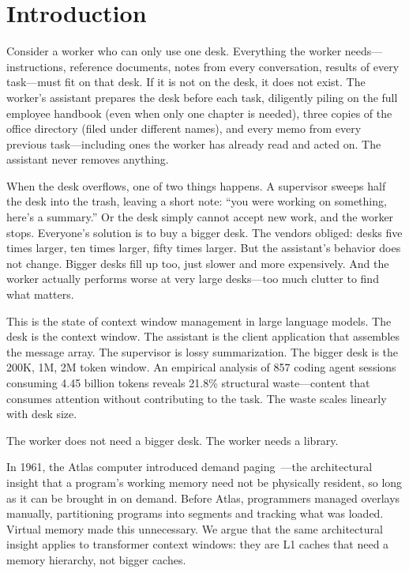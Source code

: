 \documentclass[sigplan,screen,anonymous]{acmart}
\begin{document}

\section{Introduction}

Consider a worker who can only use one desk. Everything the worker
needs---instructions, reference documents, notes from every
conversation, results of every task---must fit on that desk. If it is
not on the desk, it does not exist. The worker's assistant prepares
the desk before each task, diligently piling on the full employee
handbook (even when only one chapter is needed), three copies of the
office directory (filed under different names), and every memo from
every previous task---including ones the worker has already read and
acted on. The assistant never removes anything.

When the desk overflows, one of two things happens. A supervisor
sweeps half the desk into the trash, leaving a short note: ``you were
working on something, here's a summary.'' Or the desk simply cannot
accept new work, and the worker stops. Everyone's solution is to buy a
bigger desk. The vendors obliged: desks five times larger, ten times
larger, fifty times larger. But the assistant's behavior does not
change. Bigger desks fill up too, just slower and more expensively.
And the worker actually performs worse at very large desks---too much
clutter to find what matters.

This is the state of context window management in large language
models. The desk is the context window. The assistant is the client
application that assembles the message array. The supervisor is lossy
summarization. The bigger desk is the 200K, 1M, 2M token window. An
empirical analysis of 857 coding agent sessions consuming 4.45 billion
tokens reveals 21.8\% structural waste---content that consumes
attention without contributing to the task. The waste scales linearly
with desk size.

The worker does not need a bigger desk. The worker needs a library.

In 1961, the Atlas computer introduced demand
paging~\cite{kilburn1962atlas}---the architectural insight that a
program's working memory need not be physically resident, so long as
it can be brought in on demand. Before Atlas, programmers managed
overlays manually, partitioning programs into segments and tracking
what was loaded. Virtual memory made this unnecessary. We argue that
the same architectural insight applies to transformer context windows:
they are L1 caches that need a memory hierarchy, not bigger caches.
\end{document}
